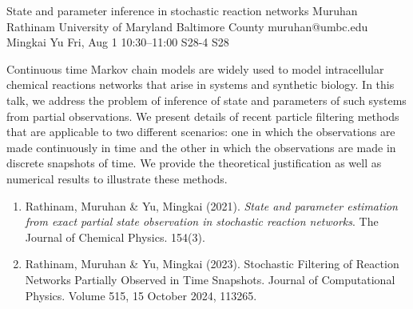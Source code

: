 \documentclass[12pt,lettersize,oneside]{book} %
\begin{document}
\begin{talk}
  {State and parameter inference in stochastic reaction networks}%
  {Muruhan Rathinam}%
  {University of Maryland Baltimore County}%
  {muruhan@umbc.edu}%
  {Mingkai Yu}%
  {}%
  {Fri, Aug 1 10:30--11:00}%
  {S28-4}%
  {S28}%
  
    
Continuous time Markov chain models are widely used to model intracellular chemical reactions networks that arise in systems and synthetic biology. In this talk, we address the problem of inference of state and parameters of such systems from partial observations. We present details of recent particle filtering methods that are applicable to two different scenarios: one in which the observations are made continuously in time and the other in which the observations are made in discrete snapshots of time.            We provide the theoretical justification as well as numerical results to illustrate these methods.       
   
\medskip

\begin{enumerate}
 \item[{[1]}] Rathinam, Muruhan \& Yu, Mingkai (2021). {\it State and parameter estimation from exact partial state observation in stochastic reaction networks}. The Journal of Chemical Physics. 
 154(3).
 \item[{[2]}] Rathinam, Muruhan \& Yu, Mingkai (2023). Stochastic Filtering of Reaction Networks Partially Observed in Time Snapshots. Journal of Computational Physics. 
Volume 515, 15 October 2024, 113265. 

\end{enumerate}

\end{talk}
\end{document}
